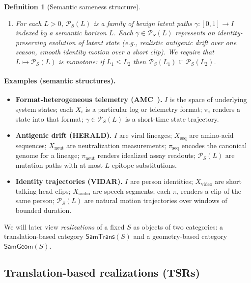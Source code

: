 \documentclass[11pt]{article}
\newtheorem{definition}{Definition}
\newcommand{\SamTrans}{\mathsf{SamTrans}}
\newcommand{\SamGeom}{\mathsf{SamGeom}}
\begin{document}
\begin{definition}[Semantic sameness structure]
\begin{enumerate}[label=\textnormal{(\roman*)}, leftmargin=*]
\item For each $L>0$, $\mathcal{P}_S(L)$ is a family of \emph{benign latent paths}
$\gamma : [0,1]\to I$ indexed by a \emph{semantic horizon} $L$.
Each $\gamma\in\mathcal{P}_S(L)$ represents an identity-preserving evolution of latent state
(e.g., realistic antigenic drift over one season, smooth identity motion over a short clip).
We require that $L\mapsto \mathcal{P}_S(L)$ is monotone:
if $L_1\le L_2$ then $\mathcal{P}_S(L_1)\subseteq \mathcal{P}_S(L_2)$.
\end{enumerate}
\end{definition}

\paragraph{Examples (semantic structures).}
\begin{itemize}[leftmargin=*]
\item \textbf{Format-heterogeneous telemetry (AMC~\cite{davis2025amc}).} $I$ is the space of 
underlying system states; each $X_i$ is a particular log or telemetry format; $\pi_i$ renders 
a state into that format; $\gamma\in\mathcal{P}_S(L)$ is a short-time state trajectory.

\item \textbf{Antigenic drift (HERALD).} $I$ are viral lineages; $X_{\mathrm{seq}}$ are amino-acid
sequences; $X_{\mathrm{neut}}$ are neutralization measurements; $\pi_{\mathrm{seq}}$ encodes the
canonical genome for a lineage; $\pi_{\mathrm{neut}}$ renders idealized assay readouts;
$\mathcal{P}_S(L)$ are mutation paths with at most $L$ epitope substitutions.

\item \textbf{Identity trajectories (VIDAR).} $I$ are person identities; $X_{\mathrm{video}}$
are short talking-head clips; $X_{\mathrm{audio}}$ are speech segments; each $\pi_i$ renders a
clip of the same person; $\mathcal{P}_S(L)$ are natural motion trajectories over windows of
bounded duration.
\end{itemize}

We will later view \emph{realizations} of a fixed $S$ as objects of two categories:
a translation-based category $\SamTrans(S)$ and a geometry-based category $\SamGeom(S)$.

\subsection{Translation-based realizations (TSRs)}
\label{subsec:tsr}
\end{document}
